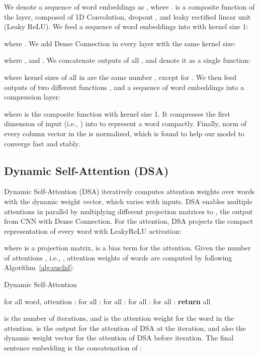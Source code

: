 \documentclass[11pt,a4paper]{article}
\begin{document}
We denote a sequence of word embeddings as , where .  is a composite function of the  layer, composed of 1D Convolution, dropout \cite{dropout}, and leaky rectified
linear unit (Leaky ReLU). We feed a sequence of word embeddings into  with kernel size 1:

where . We add Dense Connection in every layer  with the same kernel size:

where , and . We concatenate outputs of all , and denote it as a single function:

where kernel sizes of all  in  are the same number , except for . We then feed outputs of two different functions , and a sequence of word embeddings  into a compression layer:

where  is the composite function with kernel size 1. It compresses the first dimension of input (i.e., ) into  to represent a word compactly. Finally,  norm of every column vector  in the  is normalized, which is found to help our model to converge fast and stably.




\subsection{Dynamic Self-Attention (DSA)}\label{module2}
Dynamic Self-Attention (DSA) iteratively computes attention weights over words with the dynamic weight vector, which varies with inputs. DSA enables multiple attentions in parallel by multiplying different projection matrices to , the output from CNN with Dense Connection. For the  attention, DSA projects the compact representation of every word  with LeakyReLU activation:

where  is a projection matrix,  is a bias term for the  attention. Given the number of attentions , i.e., , attention weights of words are computed by following Algorithm~\ref{alg:euclid}:

\begin{algorithm}[H]
\centering
\caption{Dynamic Self-Attention}\label{alg:euclid}
\begin{algorithmic}[1]
\State for all  word,  attention : 
\State for all  : 
\State for all  : 
\State for all  : \label{query}
\State for all  : 
\EndFor\label{euclidendwhile}
\State \textbf{return} all 
\EndProcedure
\end{algorithmic}
\end{algorithm}

 is the number of iterations, and  is the attention weight for the  word in the  attention.  is the output for the  attention of DSA at the  iteration, and also the dynamic weight vector for the  attention of DSA before  iteration. The final sentence embedding  is the concatenation of :
\end{document}
